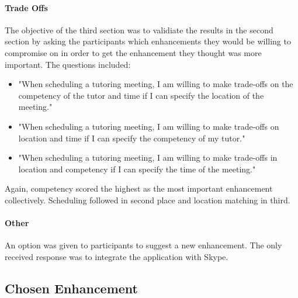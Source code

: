 \paragraph{Trade Offs}
The objective of the third section was to validiate the results in the second section by asking the participants which enhancements they would be willing to compromise on in order to get the enhancement they thought was more important. The questions included:
 \begin{itemize}
  \item "When scheduling a tutoring meeting, I am willing to make trade-offs on the competency of the tutor and time if I can specify the location of the meeting."
  \item "When scheduling a tutoring meeting, I am willing to make trade-offs on location and time if I can specify the competency of my tutor."
  \item "When scheduling a tutoring meeting, I am willing to make trade-offs in location and competency if I can specify the time of the meeting."
\end{itemize}
Again, competency scored the highest as the most important enhancement collectively. Scheduling followed in second place and location matching in third.

\paragraph{Other}
An option was given to participants to suggest a new enhancement. The only received response was to integrate the application with Skype.

\subsection{Chosen Enhancement}
\label{sec:chosen-enhancement}

